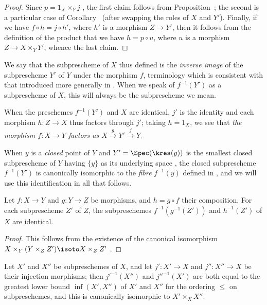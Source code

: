 \begin{proof}
Since $p=1_X\times_Y j$ , the first claim follows from Proposition~;
the second is a particular case of Corollary~ (after swapping the roles of $X$ and $Y'$).
Finally, if we have $f\circ h=j\circ h'$, where $h'$ is a morphism $Z\to Y'$, then it follows from the definition of the product that we have $h=p\circ u$, where $u$ is a morphism $Z\to X\times_Y Y'$, whence the last claim.
\end{proof}

We say that the subprescheme of $X$ thus defined is the \emph{inverse image} of the subprescheme $Y'$ of $Y$ under the morphism $f$, terminology which is consistent with that introduced
more generally in .
When we speak of $f^{-1}(Y')$ as a subprescheme of $X$, this will always be the subprescheme we mean.

When the preschemes $f^{-1}(Y')$ and $X$ are identical, $j'$ is the identity and each morphism $h:Z\to X$ thus factors through $j'$; taking $h=1_X$, we see that \emph{the morphism $f:X\to Y$ factors as $X\xrightarrow{g}Y'\xrightarrow{j}Y$}.

When $y$ is a \emph{closed} point of $Y$ and $Y'=\Spec(\kres(y))$ is the smallest closed subprescheme of $Y$ having $\{y\}$ as its underlying space , the closed subprescheme $f^{-1}(Y')$ is canonically isomorphic to the \emph{fibre} $f^{-1}(y)$ defined in , and we will use this identification in all that follows.

\begin{corollary}[4.4.2]
\label{I.4.4.2}
Let $f:X\to Y$ and $g:Y\to Z$ be morphisms, and $h=g\circ f$ their composition.
For each subprescheme $Z'$ of $Z$, the subpreschemes $f^{-1}(g^{-1}(Z'))$ and $h^{-1}(Z')$ of $X$ are identical.
\end{corollary}

\begin{proof}
This follows from the existence of the canonical isomorphism $X\times_Y(Y\times_Z Z')\isoto X\times_Z Z'$ .
\end{proof}

\begin{corollary}[4.4.3]
\label{I.4.4.3}
Let $X'$ and $X''$ be subpreschemes of $X$, and let $j':X'\to X$ and $j'':X''\to X$ be their injection morphisms;
then ${j'}^{-1}(X'')$ and ${j''}^{-1}(X')$ are both equal to the greatest lower bound $\inf(X',X'')$ of $X'$ and $X''$ for the ordering $\leq$ on subpreschemes, and this is canonically isomorphic to $X'\times_X X''$.
\end{corollary}

